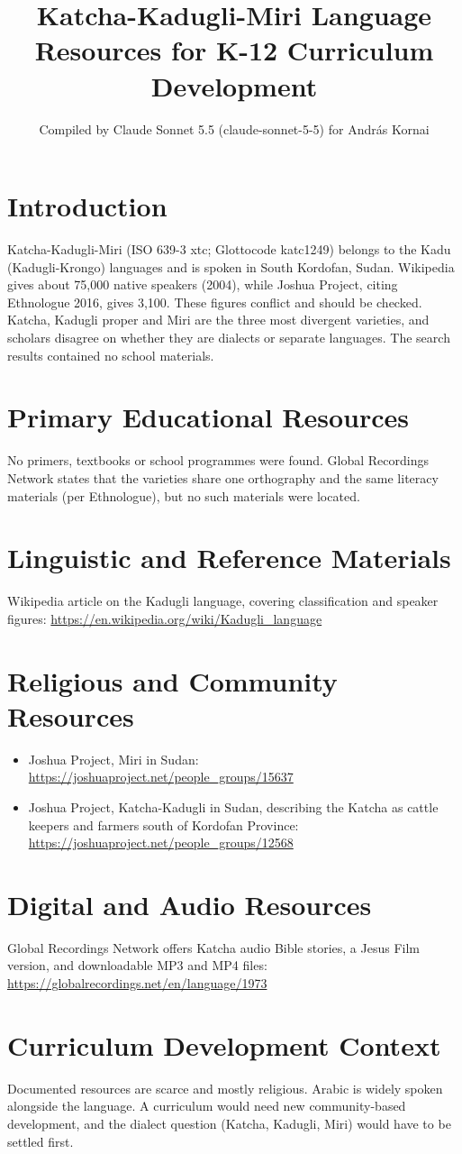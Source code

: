 \documentclass[12pt]{article}
\title{Katcha-Kadugli-Miri Language Resources for K-12 Curriculum Development}
\author{Compiled by Claude Sonnet 5.5 (claude-sonnet-5-5) for Andr\'as Kornai}
\date{}
\begin{document}
\maketitle

\section{Introduction}
Katcha-Kadugli-Miri (ISO 639-3 xtc; Glottocode katc1249) belongs to the Kadu (Kadugli-Krongo) languages and is spoken in South Kordofan, Sudan. Wikipedia gives about 75,000 native speakers (2004), while Joshua Project, citing Ethnologue 2016, gives 3,100. These figures conflict and should be checked. Katcha, Kadugli proper and Miri are the three most divergent varieties, and scholars disagree on whether they are dialects or separate languages. The search results contained no school materials.

\section{Primary Educational Resources}
No primers, textbooks or school programmes were found. Global Recordings Network states that the varieties share one orthography and the same literacy materials (per Ethnologue), but no such materials were located.

\section{Linguistic and Reference Materials}
Wikipedia article on the Kadugli language, covering classification and speaker figures: \url{https://en.wikipedia.org/wiki/Kadugli_language}

\section{Religious and Community Resources}
\begin{itemize}
\item Joshua Project, Miri in Sudan: \url{https://joshuaproject.net/people_groups/15637}
\item Joshua Project, Katcha-Kadugli in Sudan, describing the Katcha as cattle keepers and farmers south of Kordofan Province: \url{https://joshuaproject.net/people_groups/12568}
\end{itemize}

\section{Digital and Audio Resources}
Global Recordings Network offers Katcha audio Bible stories, a Jesus Film version, and downloadable MP3 and MP4 files: \url{https://globalrecordings.net/en/language/1973}

\section{Curriculum Development Context}
Documented resources are scarce and mostly religious. Arabic is widely spoken alongside the language. A curriculum would need new community-based development, and the dialect question (Katcha, Kadugli, Miri) would have to be settled first.
\end{document}
